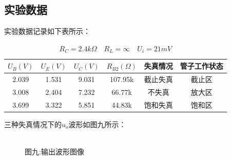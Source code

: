 \documentclass[a4paper]{article}
\begin{document}
    \subsection{实验数据}\label{subsec:19}
    {{实验数据记录如下表所示：}}
    \begin{table}[htbp]
        \centering
        \caption{$R_C=2.4k\Omega\quad R_L=\infty\quad U_i=21mV$}
        \begin{tabular}{|c|c|c|c|c|c|}
            \hline
            $U_B(V)$ & $U_E(V)$ & $U_C(V)$ & $R_{B2}(\Omega)$ & 失真情况 & 管子工作状态 \\
            \hline
            2.039    & 1.531    & 9.031    & 107.95k          & 截止失真 & 截止区    \\
            \hline
            3.008    & 2.404    & 7.232    & 66.77k           & 不失真  & 放大区    \\
            \hline
            3.699    & 3.322    & 5.851    & 44.83k           & 饱和失真 & 饱和区    \\
            \hline
        \end{tabular}\label{tab:table4}
    \end{table}

    {{三种失真情况下的$u_o$波形如图九所示：}}
    \begin{figure}[htb]
        \centering
        \\
        {\small 图九:输出波形图像}
    \end{figure}
\end{document}
